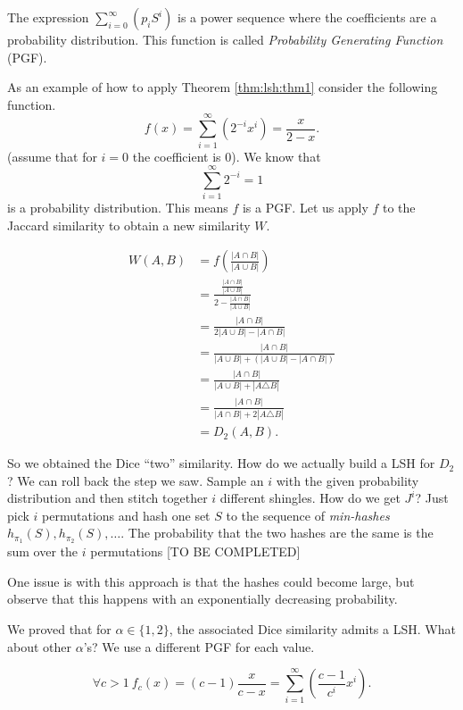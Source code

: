  
The expression $\sum_{i=0}^\infty (p_iS^i)$ is a power sequence where the coefficients are a probability distribution. This function is called \emph{Probability Generating Function} (PGF).

As an example of how to apply Theorem \ref{thm:lsh:thm1} consider the following function.
\begin{equation}
	f(x) = \sum_{i=1}^\infty (2^{-i}x^i) = \frac{x}{2 - x}.
\end{equation}
(assume that for $i=0$ the coefficient is $0$). We know that
\begin{equation}
	\sum_{i=1}^\infty 2^{-i} = 1
\end{equation}
is a probability distribution. This means $f$ is a PGF. Let us apply $f$ to the Jaccard similarity to obtain a new similarity $W$.

\begin{align}
	W(A, B) &= f\left(\frac{|A \cap B|}{|A \cup B|}\right) \\
	&= \frac{\frac{|A \cap B|}{|A \cup B|}}{2 - \frac{|A \cap B|}{|A \cup B|}}\\
	& = \frac{|A \cap B|}{2|A \cup B| - |A \cap B|}\\
	& = \frac{|A \cap B|}{|A \cup B| + (|A \cup B| - |A \cap B|)}\\
	& = \frac{|A \cap B|}{|A \cup B| + |A \triangle B|}\\
	& = \frac{|A \cap B|}{|A \cap B| + 2|A \triangle B|}\\
	&= D_2(A, B).
\end{align}

So we obtained the Dice ``two'' similarity. How do we actually build a LSH for $D_2$? We can roll back the step we saw. Sample an $i$ with the given probability distribution and then stitch together $i$ different shingles. How do we get $J^i$? Just pick $i$ permutations and hash one set $S$ to the sequence of \emph{min-hashes} $h_{\pi_1}(S), h_{\pi_2}(S), \ldots$. The probability that the two hashes are the same is the sum over the $i$ permutations [TO BE COMPLETED]

One issue is with this approach is that the hashes could become large, but observe that this happens with an exponentially decreasing probability.

We proved that for $\alpha \in \{1, 2\}$, the associated Dice similarity admits a LSH. What about other $\alpha$'s? We use a different PGF for each value.

\begin{equation}
	\forall c > 1\ f_c(x) = (c-1)\frac{x}{c-x} = \sum_{i=1}^\infty \left(\frac{c-1}{c^i} x^i\right).
\end{equation}

